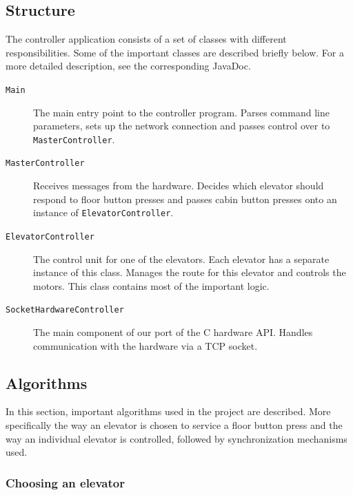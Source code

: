 \documentclass[a4paper]{article}
\begin{document}
\subsection{Structure}

The controller application consists of a set of classes with different
responsibilities. Some of the important classes are described briefly below. For
a more detailed description, see the corresponding JavaDoc.

\begin{description}

\item[\texttt{Main}] The main entry point to the controller program. Parses
    command line parameters, sets up the network connection and passes control
    over to \texttt{MasterController}.

\item[\texttt{MasterController}] Receives messages from the hardware. Decides
    which elevator should respond to floor button presses and passes cabin
    button presses onto an instance of \texttt{ElevatorController}.

\item[\texttt{ElevatorController}] The control unit for one of the elevators.
    Each elevator has a separate instance of this class. Manages the route for
    this elevator and controls the motors. This class contains most of the
    important logic.

\item[\texttt{SocketHardwareController}] The main component of our port of the C
    hardware API. Handles communication with the hardware via a TCP socket.

\end{description}

\subsection{Algorithms}
In this section, important algorithms used in the project are described. More
specifically the way an elevator is chosen to service a floor button press and
the way an individual elevator is controlled, followed by synchronization
mechanisms used.

\subsubsection{Choosing an elevator}
\end{document}
